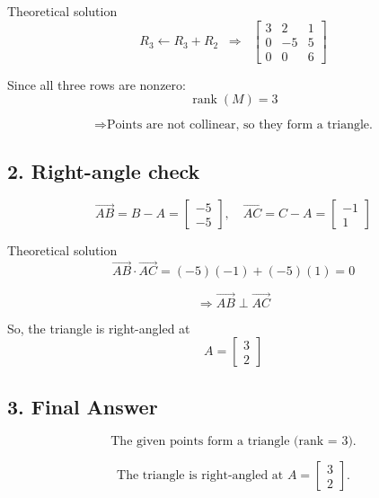 \documentclass{beamer}
\begin{document}
\begin{frame}{Theoretical solution}
\begin{equation}
R_3 \leftarrow R_3+R_2
\;\;\Rightarrow\;\;
\begin{bmatrix}
3 & 2 & 1\\
0 & -5 & 5\\
0 & 0 & 6
\end{bmatrix}
\end{equation}

Since all three rows are nonzero:
\begin{equation}
\operatorname{rank}(M)=3
\end{equation}

\[
\Rightarrow \text{Points are not collinear, so they form a triangle.}
\]

\subsection*{2. Right-angle check}

\begin{equation}
\overrightarrow{AB}=B-A=\begin{bmatrix}-5\\-5\end{bmatrix}, \quad
\overrightarrow{AC}=C-A=\begin{bmatrix}-1\\1\end{bmatrix}
\end{equation}

\end{frame}

\begin{frame}{Theoretical solution}
\begin{equation}
\overrightarrow{AB}\cdot \overrightarrow{AC} = (-5)(-1)+(-5)(1)=0
\end{equation}

\[
\Rightarrow \overrightarrow{AB}\perp \overrightarrow{AC}
\]

So, the triangle is right-angled at
\begin{equation}
A=\begin{bmatrix}3\\2\end{bmatrix}
\end{equation}


\subsection*{3. Final Answer}

\begin{equation}
\text{The given points form a triangle (rank = 3).}
\end{equation}

\begin{equation}
\text{The triangle is right-angled at } A=\begin{bmatrix}3\\2\end{bmatrix}.
\end{equation}

\end{frame}
\end{document}
